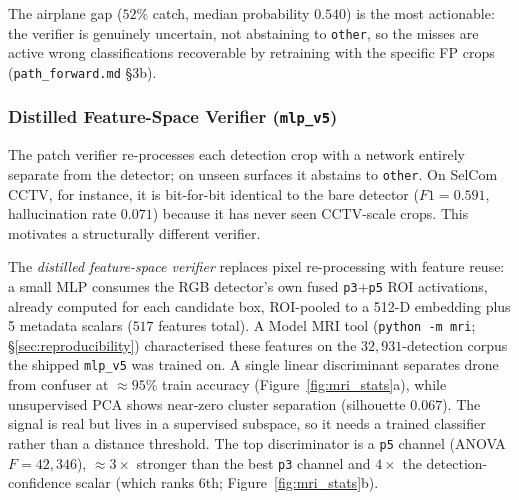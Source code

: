 The airplane gap ($52\%$ catch, median probability $0.540$) is the most actionable: the verifier is genuinely uncertain, not abstaining to \texttt{other}, so the misses are active wrong classifications recoverable by retraining with the specific FP crops (\texttt{path\_forward.md} \S3b).

\subsubsection{Distilled Feature-Space Verifier (\texttt{mlp\_v5})}
\label{sec:distill_verifier}

The patch verifier re-processes each detection crop with a network entirely separate from the detector; on unseen surfaces it abstains to \texttt{other}. On SelCom CCTV, for instance, it is bit-for-bit identical to the bare detector ($F1=0.591$, hallucination rate $0.071$) because it has never seen CCTV-scale crops. This motivates a structurally different verifier.

The \emph{distilled feature-space verifier} replaces pixel re-processing with feature reuse: a small MLP consumes the RGB detector's own fused \texttt{p3}+\texttt{p5} ROI activations, already computed for each candidate box, ROI-pooled to a 512-D embedding plus 5 metadata scalars ($517$ features total). A Model MRI tool (\texttt{python -m mri}; \S\ref{sec:reproducibility}) characterised these features on the $32{,}931$-detection corpus the shipped \texttt{mlp\_v5} was trained on. A single linear discriminant separates drone from confuser at ${\approx}95\%$ train accuracy (Figure~\ref{fig:mri_stats}a), while unsupervised PCA shows near-zero cluster separation (silhouette $0.067$). The signal is real but lives in a supervised subspace, so it needs a trained classifier rather than a distance threshold. The top discriminator is a \texttt{p5} channel (ANOVA $F=42{,}346$), ${\approx}3\times$ stronger than the best \texttt{p3} channel and $4\times$ the detection-confidence scalar (which ranks 6th; Figure~\ref{fig:mri_stats}b).


